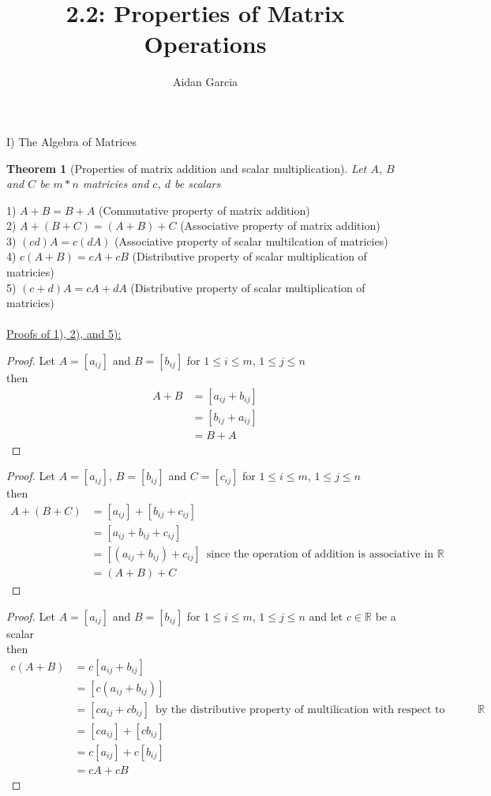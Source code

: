 \documentclass{jhwhw}
\author{Aidan Garcia}
\title{2.2: Properties of Matrix Operations}
\newtheorem{theorem}{Theorem}
\theoremstyle{definition}
\theoremstyle{remark}
\theoremstyle{example}
\begin{document}
I) The Algebra of Matrices\\

\begin{theorem}[Properties of matrix addition and scalar multiplication] Let \(A\), \(B\) and \(C\) be \(m*n\) matricies and \(c\), \(d\) be scalars \end{theorem}

1) \(A+B=B+A\) (Commutative property of matrix addition)\\
2) \(A+(B+C)=(A+B)+C\) (Associative property of matrix addition)\\
3) \((cd)A = c(dA)\) (Associative property of scalar multilcation of matricies)\\
4) \(c(A+B)=cA + cB\) (Distributive property of scalar multiplication of matricies)\\
5) \((c+d)A = cA+dA\) (Distributive property of scalar multiplication of matricies)
\\ \\
\underline{Proofs of 1), 2), and 5):}
\\
\begin{proof} Let \(A=[a_{ij}]\) and \(B=[b_{ij}]\) for \(1 \leq i \leq m\), \(1 \leq j \leq n\)\\
then \begin{align*} 
A+B &= [a_{ij} + b_{ij}]\\
&=[b_{ij} + a_{ij}]\\
&=B+A
\end{align*}
\end{proof}
\begin{proof} Let \(A=[a_{ij}]\), \(B=[b_{ij}]\) and \(C=[c_{ij}]\) for \(1 \leq i \leq m\), \(1 \leq j \leq n\)\\
    then \begin{align*} 
    A+(B+C) &= [a_{ij}] + [b_{ij} + c_{ij}]\\
    &= [a_{ij} + b_{ij} + c_{ij}]\\
    &= [(a_{ij} + b_{ij}) + c_{ij}] \, \text{ since the operation of addition is associative in } \mathbb{R}\\
    &= (A+B)+C
    \end{align*}
\end{proof}
\begin{proof} 
    Let \(A=[a_{ij}]\) and \(B=[b_{ij}]\) for \(1 \leq i \leq m\), \(1 \leq j \leq n\) and let \(c \in \mathbb{R}\) be a scalar\\
    then \begin{align*} 
    c(A+B) &= c[a_{ij} + b_{ij}]\\
    &= [c(a_{ij} + b_{ij})]\\
    &= [c a_{ij} + c b_{ij}] \, \text{ by the distributive property of multilication with respect to addition in } \mathbb{R}\\
    &=[c a_{ij}] + [c b_{ij}]\\
    &=c[a_{ij}] + c[b_{ij}]\\
    &=cA + cB
    \end{align*}
\end{proof}
\end{document}

